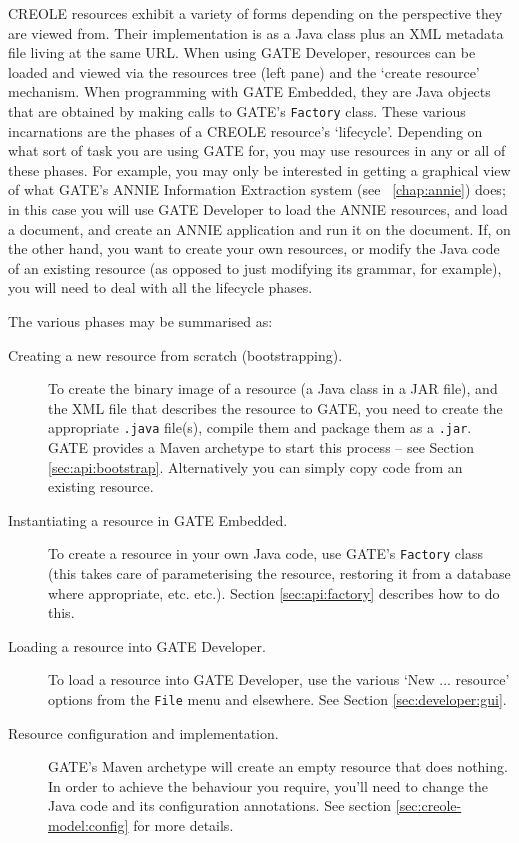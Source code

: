 CREOLE resources exhibit a variety of forms depending on the perspective they are
viewed from. Their implementation is as a Java class plus an XML metadata file
living at the same URL. When using GATE Developer, resources can be loaded and
viewed via the resources tree (left pane) and the `create resource' mechanism.
When programming with GATE Embedded, they are Java objects that are obtained by
making calls to GATE's {\tt Factory} class. These various incarnations are the
phases of a CREOLE resource's `lifecycle'. Depending on what sort of task you are
using GATE for, you may use resources in any or all of these phases. For example,
you may only be interested in getting a graphical view of what GATE's ANNIE
Information Extraction system (see \Chapthing\ \ref{chap:annie}) does; in this
case you will use GATE Developer to load the ANNIE resources, and load a
document, and create an ANNIE application and run it on the document. If, on the
other hand, you want to create your own resources, or modify the Java code of an
existing resource (as opposed to just modifying its grammar, for example), you
will need to deal with all the lifecycle phases.

The various phases may be summarised as:
%
\begin{description}
%
\item[Creating a new resource from scratch (bootstrapping).]
To create the binary image of a resource (a Java class in a JAR file),
and the XML file that describes the resource to GATE, you need to
create the appropriate {\tt .java} file(s), compile them and package
them as a {\tt .jar}. GATE provides a Maven archetype to
start this process -- see
Section \ref{sec:api:bootstrap}. Alternatively you can simply copy
code from an existing resource.
%
\item[Instantiating a resource in GATE Embedded.]
To create a resource in your own Java code, use GATE's {\tt Factory} class
(this takes care of parameterising the resource, restoring it from a database
where appropriate, etc. etc.). Section \ref{sec:api:factory} describes how
to do this.
%
\item[Loading a resource into GATE Developer.]
To load a resource into GATE Developer, use the various `New
... resource' options from the {\tt File} menu and elsewhere. See
Section
\ref{sec:developer:gui}.
%
\item[Resource configuration and implementation.]
GATE's Maven archetype will create an empty resource that does nothing. In
order to achieve the behaviour you require, you'll need to change the
Java code and its configuration annotations.
See section \ref{sec:creole-model:config} for more details.
%
\end{description}
%




